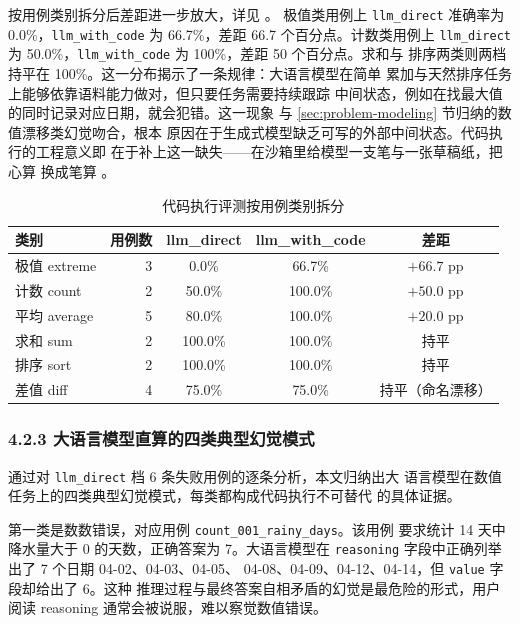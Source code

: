 按用例类别拆分后差距进一步放大，详见 。
极值类用例上 \texttt{llm\_\bk{}direct} 准确率为 0.0\%，\texttt{llm\_\bk{}with\_\bk{}code}
为 66.7\%，差距 66.7 个百分点。计数类用例上 \texttt{llm\_\bk{}direct} 为
50.0\%，\texttt{llm\_\bk{}with\_\bk{}code} 为 100\%，差距 50 个百分点。求和与
排序两类则两档持平在 100\%。这一分布揭示了一条规律：大语言模型在简单
累加与天然排序任务上能够依靠语料能力做对，但只要任务需要持续跟踪
中间状态，例如在找最大值的同时记录对应日期，就会犯错。这一现象
与 \ref{sec:problem-modeling} 节归纳的数值漂移类幻觉吻合，根本
原因在于生成式模型缺乏可写的外部中间状态。代码执行的工程意义即
在于补上这一缺失——在沙箱里给模型一支笔与一张草稿纸，把心算
换成笔算 \cite{ref20}。

\begin{table}[!ht]
    \centering
    \caption{代码执行评测按用例类别拆分}
    \label{tab:code-eval-category}
    \song\wuhao
    \begin{tabular}{lrccc}
        \toprule
        类别 & 用例数 & llm\_direct & llm\_with\_code & 差距 \\
        \midrule
        极值 extreme & 3 & 0.0\% & 66.7\% & $+66.7$ pp \\
        计数 count & 2 & 50.0\% & 100.0\% & $+50.0$ pp \\
        平均 average & 5 & 80.0\% & 100.0\% & $+20.0$ pp \\
        求和 sum & 2 & 100.0\% & 100.0\% & 持平 \\
        排序 sort & 2 & 100.0\% & 100.0\% & 持平 \\
        差值 diff & 4 & 75.0\% & 75.0\% & 持平（命名漂移） \\
        \bottomrule
    \end{tabular}
\end{table}

\subsubsection*{4.2.3 \quad 大语言模型直算的四类典型幻觉模式}

通过对 \texttt{llm\_\bk{}direct} 档 6 条失败用例的逐条分析，本文归纳出大
语言模型在数值任务上的四类典型幻觉模式，每类都构成代码执行不可替代
的具体证据。

第一类是数数错误，对应用例 \texttt{count\_\bk{}001\_\bk{}rainy\_\bk{}days}。该用例
要求统计 14 天中降水量大于 0 的天数，正确答案为 7。大语言模型在
\texttt{reasoning} 字段中正确列举出了 7 个日期 04-02、04-03、04-05、
04-08、04-09、04-12、04-14，但 \texttt{value} 字段却给出了 6。这种
推理过程与最终答案自相矛盾的幻觉是最危险的形式，用户阅读 reasoning
通常会被说服，难以察觉数值错误。

